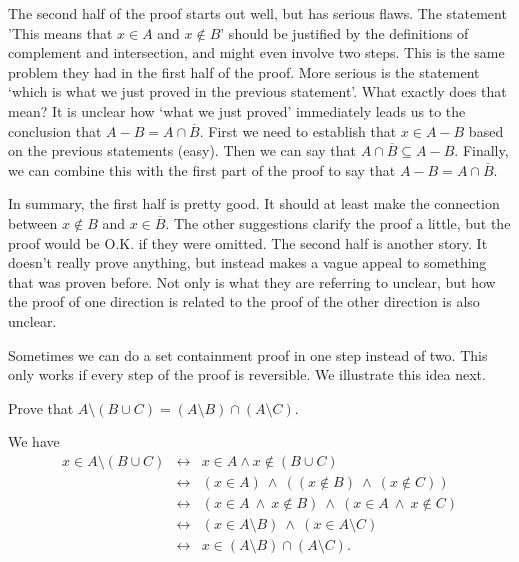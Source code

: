 \begin{eval}
\begin{answer}
\begin{pfevalenum}
The second half of the proof starts out well, but has serious flaws.
The statement 'This means that $x\in A$ and $x\not\in B$'
should be justified by the definitions of complement and intersection, and might even involve two steps.
This is the same problem they had in the first half of the proof.
More serious is the statement `which is what we just proved in the previous statement'.  What exactly does 
that mean?  It is unclear how `what we just proved' immediately leads us to the conclusion that 
$A-B = A\cap\overline{B}$.  First we need to establish that $x\in A-B$ based on the previous statements (easy).  
Then we can say that $A\cap\overline{B}\subseteq A-B$.  Finally, we can combine this with the first part
of the proof to say that $A-B = A\cap\overline{B}$.

In summary, the first half is pretty good.  It should at least make the connection between 
$x\not\in B$ and $x\in\overline{B}$.  The other suggestions clarify the proof a little,
but the proof would be O.K. if they were omitted.  The second half is another story.  It doesn't really
prove anything, but instead makes a vague appeal to something that was proven before.  Not only is
what they are referring to unclear, but how the proof of one direction is related to the proof of
the other direction is also unclear.
\end{pfevalenum}
\end{answer}
\end{eval}




Sometimes we can do a set containment proof in one step instead of two.  
This only works if every step of the proof is reversible.  We illustrate this idea next.


\begin{exa}\label{setpf2}
Prove that $A\setminus(B \cup C) = (A\setminus B) \cap(A\setminus
C)$.
\begin{pf}
We have $$
\begin{array}{lll} x \in A\setminus(B \cup C)
&  \leftrightarrow &  x \in A \wedge x\not \in (B \cup C)\\  
&  \leftrightarrow & (x \in A) \ \wedge \ ( (x \not \in B) \ \wedge\ (x \not \in C)) \\
&  \leftrightarrow & (x  \in A \ \wedge \ x \not \in B) \ \wedge \ (x  \in A \ \wedge \ x \not \in C)\\
&  \leftrightarrow & (x \in A\setminus B) \ \wedge\ (x \in A \setminus C) \\ 
&  \leftrightarrow & x \in (A\setminus B) \cap(A\setminus C).
 \end{array}
$$
\end{pf}
\end{exa}

